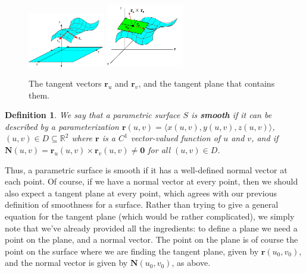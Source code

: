 \documentclass[12pt,letterpaper]{article}
\newtheorem{definition}[theorem]{Definition}
\newcommand{\R}{\mathbb{R}}
\renewcommand{\r}{\mathbf{r}}
\newcommand{\N}{\mathbf{N}}
\begin{document}
\begin{figure}[h]
 \begin{center}
  \includegraphics[width=0.3\textwidth]{tangent1.png} \hspace{24pt} \includegraphics[width=0.3\textwidth]{tangent2.png}
 \end{center}
\caption{The tangent vectors $\r_u$ and $\r_v$, and the tangent plane that contains them.}
\end{figure}

\begin{definition}
 We say that a parametric surface $S$ is \textbf{smooth} if it can be described by a parameterization $\r(u,v) = \langle x(u,v), y(u,v), z(u,v)\rangle$, $(u,v)\in D\subseteq\R^2$ where $\r$ is a $C^1$ vector-valued function of $u$ and $v$, and if $\N(u,v) = \r_u(u,v)\times \r_v(u,v) \neq \mathbf{0}$ for all $(u,v)\in D$.
\end{definition}
Thus, a parametric surface is smooth if it has a well-defined normal vector at each point. Of course, if we have a normal vector at every point, then we should also expect a tangent plane at every point, which agrees with our previous definition of smoothness for a surface. Rather than trying to give a general equation for the tangent plane (which would be rather complicated), we simply note that we've already provided all the ingredients: to define a plane we need a point on the plane, and a normal vector. The point on the plane is of course the point on the surface where we are finding the tangent plane, given by $\r(u_0,v_0)$, and the normal vector is given by $\N(u_0,v_0)$, as above.
\end{document}
